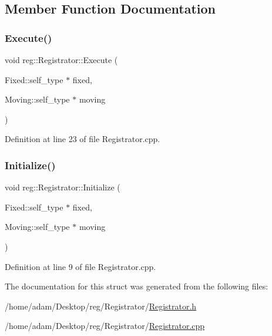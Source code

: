 \subsection{Member Function Documentation}
\mbox{\label{structreg_1_1_registrator_ac8709c0e86e8e53bffc04ae517bdb863}} 
\subsubsection{\texorpdfstring{Execute()}{Execute()}}
{\footnotesize\ttfamily void reg\+::\+Registrator\+::\+Execute (\begin{DoxyParamCaption}\item[{Fixed\+::self\+\_\+type $\ast$}]{fixed,  }\item[{Moving\+::self\+\_\+type $\ast$}]{moving }\end{DoxyParamCaption})}



Definition at line 23 of file Registrator.\+cpp.

\mbox{\label{structreg_1_1_registrator_a8415aef78761d11e560d280ce30f0de8}} 
\subsubsection{\texorpdfstring{Initialize()}{Initialize()}}
{\footnotesize\ttfamily void reg\+::\+Registrator\+::\+Initialize (\begin{DoxyParamCaption}\item[{Fixed\+::self\+\_\+type $\ast$}]{fixed,  }\item[{Moving\+::self\+\_\+type $\ast$}]{moving }\end{DoxyParamCaption})}



Definition at line 9 of file Registrator.\+cpp.



The documentation for this struct was generated from the following files\+:\begin{DoxyCompactItemize}
\item 
/home/adam/\+Desktop/reg/\+Registrator/\hyperlink{_registrator_8h}{Registrator.\+h}\item 
/home/adam/\+Desktop/reg/\+Registrator/\hyperlink{_registrator_8cpp}{Registrator.\+cpp}\end{DoxyCompactItemize}
